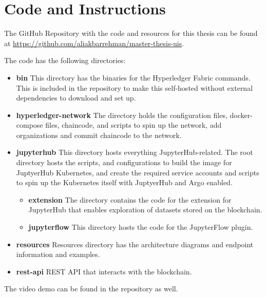 
\chapter{Code and Instructions}
\label{apx:instructions}

The GitHub Repository with the code and resources for this thesis can be found at \url{https://github.com/aliakbarrehman/master-thesis-uis}.

\bigskip
The code has the following directories:
\begin{itemize}
    \item \textbf{bin} This directory has the binaries for the Hyperledger Fabric commands. This is included in the repository to make this self-hosted without external dependencies to download and set up.
    \item \textbf{hyperledger-network} The directory holds the configuration files, docker-compose files, chaincode, and scripts to spin up the network, add organizations and commit chaincode to the network.
    \item \textbf{jupyterhub} This directory hosts everything JupyterHub-related. The root directory hosts the scripts, and configurations to build the image for JuptyerHub Kubernetes, and create the required service accounts and scripts to spin up the Kubernetes itself with JuptyerHub and Argo enabled.
        \begin{itemize}
            \item \textbf{extension} The directory contains the code for the extension for JupyterHub that enables exploration of datasets stored on the blockchain.
            \item \textbf{jupyterflow} This directory hosts the code for the JupyterFlow plugin.
        \end{itemize}
    \item \textbf{resources} Resources directory has the architecture diagrams and endpoint information and examples.
    \item \textbf{rest-api} REST API that interacts with the blockchain.
\end{itemize}

The video demo can be found in the repository as well.

